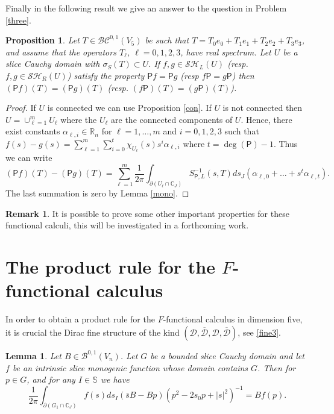 \documentclass[reqno,11pt]{amsart}
\numberwithin{equation}{section}
\newtheorem{lemma}[theorem]{Lemma}
\newtheorem{proposition}[theorem]{Proposition}
\theoremstyle{definition}
\newtheorem{remark}[theorem]{{\bf Remark}}
\begin{document}
Finally in the following result we give an answer to the question in Problem \ref{three}.
\begin{proposition}
	Let $T \in \mathcal{BC}^{0,1}(V_5)$ be such that $T= T_0e_0+T_1e_1+T_2 e_2+T_3e_3$, and assume that the operators $T_{\ell}$, $\ell=0,1,2,3$, have real spectrum. Let $U$ be a slice Cauchy domain with $\sigma_S(T)\subset U$. If $f,g\in \mathcal{SH}_L(U)$ (resp. $f,g\in \mathcal{SH}_R(U)$) satisfy the property $\mathsf Pf=\mathsf Pg$ (resp $f\mathsf P=g\mathsf P$) then $(\mathsf Pf)(T)=(\mathsf Pg)(T)$ (resp. $(f\mathsf P)(T)=(g\mathsf P)(T)$).
\end{proposition}
\begin{proof}
	If $U$ is connected we can use Proposition \ref{con}. If $U$ is not connected then $U=\cup_{\ell=1}^m U_\ell$ where the $U_\ell$ are the connected components of $U$. Hence, there exist constants $\alpha_{\ell,i}\in\mathbb R_n$ for $\ell=1,\dots, m$ and $i=0,1,2,3$ such that $f(s)-g(s)=\sum_{\ell=1}^m \sum_{i=0}^t \chi_{U_\ell}(s) s^i \alpha_{\ell,i}$ where $t=\operatorname{deg}(\mathsf P)-1$. Thus we can write
	$$
	(\mathsf P f)(T)-(\mathsf Pg)(T)=\sum_{\ell=1}^m\frac 1{2\pi}\int_{\partial(U_\ell\cap\mathbb C_J)}S^{-1}_{\mathsf P,L}(s,T)ds_J(\alpha_{\ell,0}+\dots+s^t\alpha_{\ell,t}).
	$$
	The last summation is zero by Lemma \ref{mono}.
\end{proof}

\begin{remark}
	It is possible to prove some other important properties for these functional calculi, this will be investigated in a forthcoming work.
\end{remark}

\section{The product rule for the $F$-functional calculus}\label{PRDRULE}

In order to obtain a product rule for the $F$-functional calculus in dimension five, it is crucial the Dirac fine structure of the kind $(\mathcal{D}, \mathcal{\overline{D}}, \mathcal{D}, \mathcal{\overline{D}} )$, see \eqref{fine3}.
\begin{lemma}
	\label{comm}
	Let $B \in \mathcal{B}^{0,1}(V_n)$. Let $G$ be a bounded slice Cauchy domain and let $f$ be an intrinsic slice monogenic function whose domain contains $G$. Then for $p \in G$, and for any $I \in \mathbb{S}$ we have
	$$ \frac{1}{2 \pi} \int_{\partial(G_1 \cap \mathbb{C}_J)} f(s) ds_I (\bar{s}B-Bp)(p^2-2s_0p+|s|^2)^{-1}=Bf(p).$$
\end{lemma}
\end{document}

